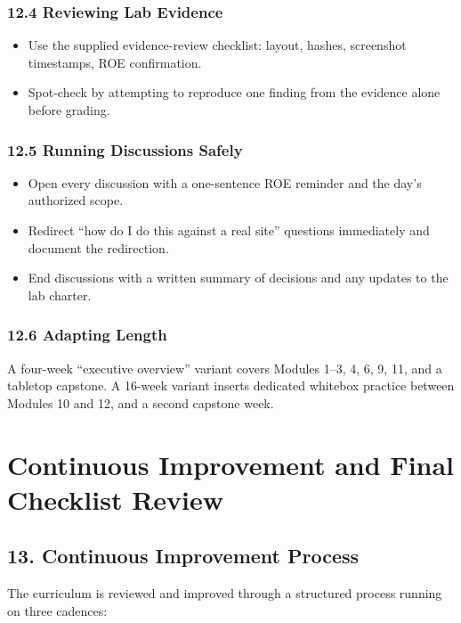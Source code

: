\documentclass[11pt,letterpaper,oneside]{report}
\begin{document}
\subsection*{12.4 Reviewing Lab Evidence}
\begin{itemize}
  \item Use the supplied evidence-review checklist: layout, hashes, screenshot timestamps, ROE confirmation.
  \item Spot-check by attempting to reproduce one finding from the evidence alone before grading.
\end{itemize}

\subsection*{12.5 Running Discussions Safely}
\begin{itemize}
  \item Open every discussion with a one-sentence ROE reminder and the day's authorized scope.
  \item Redirect ``how do I do this against a real site'' questions immediately and document the redirection.
  \item End discussions with a written summary of decisions and any updates to the lab charter.
\end{itemize}

\subsection*{12.6 Adapting Length}
A four-week ``executive overview'' variant covers Modules 1--3, 4, 6, 9, 11, and a tabletop capstone. A 16-week variant inserts dedicated whitebox practice between Modules 10 and 12, and a second capstone week.

\chapter*{Continuous Improvement and Final Checklist Review}

\section*{13. Continuous Improvement Process}
The curriculum is reviewed and improved through a structured process running on three cadences:
\end{document}
